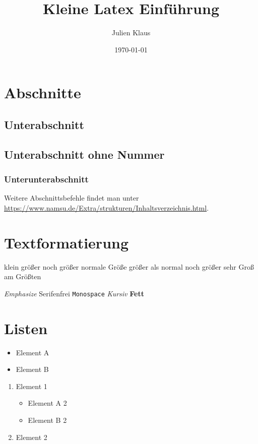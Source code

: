 \documentclass[fontsize=11]{scrartcl}
\author{Julien Klaus}
\date{\today}
\title{Kleine Latex Einführung}
\begin{document}
	
	\maketitle
	
	\tableofcontents
	
	\section{Abschnitte}
	\subsection{Unterabschnitt}
	\subsection*{Unterabschnitt ohne Nummer}
	\subsubsection{Unterunterabschnitt}
	Weitere Abschnittsbefehle findet man unter
	\url{https://www.namsu.de/Extra/strukturen/Inhaltsverzeichnis.html}.
	
	\section{Textformatierung}
	\tiny klein
	\scriptsize größer
	\footnotesize noch größer
	\normalsize normale Größe
	\large größer als normal
	\LARGE noch größer
	\huge sehr Groß
	\Huge am Größten 
	\normalsize
	
	\emph{Emphasize}
	\textsf{Serifenfrei}
	\texttt{Monospace}
	\textit{Kursiv}
	\textbf{Fett}
	
	\section{Listen}
	\begin{itemize}
		\item Element A
		\item Element B
	\end{itemize}

	\begin{enumerate}
		\item Element 1
		\begin{itemize}
			\item Element A 2
			\item Element B 2
		\end{itemize}
		\item Element 2	
	\end{enumerate}
\end{document}
